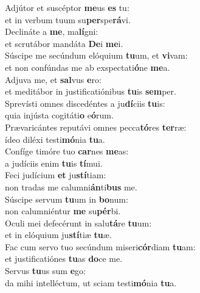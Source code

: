 \evenverse Adjútor et suscéptor \textbf{me}us \textbf{es} tu:~\*\\
\evenverse et in verbum tuum su\textbf{per}spe\textbf{rá}vi.\\
\oddverse Declináte a \textbf{me}, ma\textbf{lí}gni:~\*\\
\oddverse et scrutábor mandáta \textbf{De}i \textbf{me}i.\\
\evenverse Súscipe me secúndum elóquium \textbf{tu}um, et \textbf{vi}vam:~\*\\
\evenverse et non confúndas me ab exspectati\textbf{ó}ne \textbf{me}a.\\
\oddverse Adjuva me, et \textbf{sal}vus \textbf{e}ro:~\*\\
\oddverse et meditábor in justificatiónibus \textbf{tu}is \textbf{sem}per.\\
\evenverse Sprevísti omnes discedéntes a ju\textbf{dí}ciis \textbf{tu}is:~\*\\
\evenverse quia injústa cogitáti\textbf{o} e\textbf{ó}rum.\\
\oddverse Prævaricántes reputávi omnes pecca\textbf{tó}res \textbf{ter}ræ:~\*\\
\oddverse ídeo diléxi testi\textbf{mó}nia \textbf{tu}a.\\
\evenverse Confíge timóre tuo \textbf{car}nes \textbf{me}as:~\*\\
\evenverse a judíciis enim \textbf{tu}is \textbf{tí}mui.\\
\oddverse Feci judícium \textbf{et} ju\textbf{stí}tiam:~\*\\
\oddverse non tradas me calumni\textbf{án}ti\textbf{bus} me.\\
\evenverse Súscipe servum \textbf{tu}um in \textbf{bo}num:~\*\\
\evenverse non calumniéntur \textbf{me} su\textbf{pér}bi.\\
\oddverse Oculi mei defecérunt in salu\textbf{tá}re \textbf{tu}um:~\*\\
\oddverse et in elóquium ju\textbf{stí}tiæ \textbf{tu}æ.\\
\evenverse Fac cum servo tuo secúndum miseri\textbf{cór}diam \textbf{tu}am:~\*\\
\evenverse et justificatiónes \textbf{tu}as \textbf{do}ce me.\\
\oddverse Servus \textbf{tu}us sum \textbf{e}go:~\*\\
\oddverse da mihi intelléctum, ut sciam testi\textbf{mó}nia \textbf{tu}a.\\
